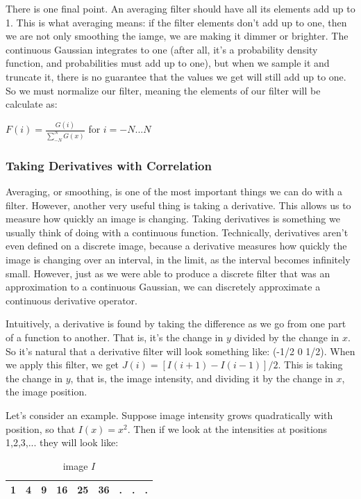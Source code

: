 \documentclass{report}
\begin{document}
There is one final point. An averaging filter should have all its elements add up to 1. This is what averaging means: if the filter elements don't add up to one, then we are not only smoothing the iamge, we are making it dimmer or brighter. The continuous Gaussian integrates to one (after all, it's a probability density function, and probabilities must add up to one), but when we sample it and truncate it, there is no guarantee that the values we get will still add up to one. So we must normalize our filter, meaning the elements of our filter will be calculate as:\newline\newline
    \centerline{$F(i) = \frac{G(i)}{\sum_{-N}^{N}G(x)}$ for $i=-N...N$}\newline

\subsubsection{Taking Derivatives with Correlation}
Averaging, or smoothing, is one of the most important things we can do with a filter. However, another very useful thing is taking a derivative. This allows us to measure how quickly an image is changing. Taking derivatives is something we usually think of doing with a continuous function. Technically, derivatives aren't even defined on a discrete image, because a derivative measures how quickly the image is changing over an interval, in the limit, as the interval becomes infinitely small. However, just as we were able to produce a discrete filter that was an approximation to a continuous Gaussian, we can discretely approximate a continuous derivative operator.

Intuitively, a derivative is found by taking the difference as we go from one part of a function to another. That is, it's the change in $y$ divided by the change in $x$. So it's natural that a derivative filter will look something like: (-1/2 0 1/2). When we apply this filter, we get $J(i) = [I(i+1)-I(i-1)]/2$. This is taking the change in $y$, that is, the image intensity, and dividing it by the change in $x$, the image position.

Let's consider an example. Suppose image intensity grows quadratically with position, so that $I(x)=x^2$. Then if we look at the intensities at positions 1,2,3,... they will look like:

\begin{table}[ht]
\centering
\label{my-label-3}
\begin{tabular}{|l|l|l|l|l|l|l|l|l|}
\hline
1 & 4 & 9 & 16 & 25 & 36 & . & . & . \\ \hline
\end{tabular}
\caption{image $I$}
\end{table}
\end{document}
